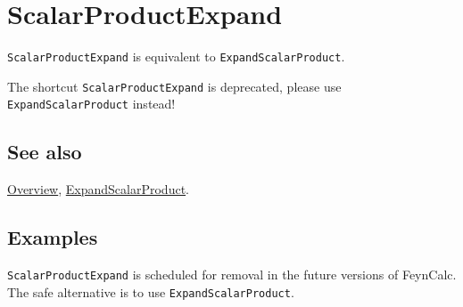 \documentclass[../FeynCalcManual.tex]{subfiles}
\begin{document}
\hypertarget{scalarproductexpand}{%
\section{ScalarProductExpand}\label{scalarproductexpand}}

\texttt{ScalarProductExpand} is equivalent to
\texttt{ExpandScalarProduct}.

The shortcut \texttt{ScalarProductExpand} is deprecated, please use
\texttt{ExpandScalarProduct} instead!

\subsection{See also}

\hyperlink{toc}{Overview},
\hyperlink{expandscalarproduct}{ExpandScalarProduct}.

\subsection{Examples}

\texttt{ScalarProductExpand} is scheduled for removal in the future
versions of FeynCalc. The safe alternative is to use
\texttt{ExpandScalarProduct}.
\end{document}
